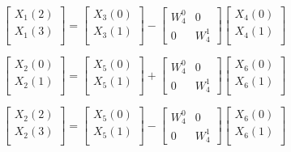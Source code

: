 \documentclass[journal,12pt,twocolumn]{IEEEtran}
\renewcommand\thesection{\arabic{section}}
\begin{document}
\begin{enumerate}[label=\arabic*.,ref=\thesection.\theenumi]
	\begin{equation}
		\begin{bmatrix}
			X_{1}(2) \\ 
			X_{1}(3)\\ 
		\end{bmatrix}
		=
		\begin{bmatrix}
			X_{3}(0) \\ 
			X_{3}(1)\\ 
		\end{bmatrix}
		-
		\begin{bmatrix}
			W^{0}_{4} & 0\\
			0 & W^{1}_{4}
		\end{bmatrix}
		\begin{bmatrix}
			X_{4}(0) \\ 
			X_{4}(1) \\ 
		\end{bmatrix}
	\end{equation}
	
	\begin{equation}
		\begin{bmatrix}
			X_{2}(0) \\ 
			X_{2}(1)\\ 
		\end{bmatrix}
		=
		\begin{bmatrix}
			X_{5}(0) \\ 
			X_{5}(1)\\ 
		\end{bmatrix}
		+
		\begin{bmatrix}
			W^{0}_{4} & 0\\
			0 & W^{1}_{4}
		\end{bmatrix}
		\begin{bmatrix}
			X_{6}(0) \\ 
			X_{6}(1) \\ 
		\end{bmatrix}
	\end{equation}
	
	\begin{equation}
		\begin{bmatrix}
			X_{2}(2) \\ 
			X_{2}(3)\\ 
		\end{bmatrix}
		=
		\begin{bmatrix}
			X_{5}(0) \\ 
			X_{5}(1)\\ 
		\end{bmatrix}
		-
		\begin{bmatrix}
			W^{0}_{4} & 0\\
			0 & W^{1}_{4}
		\end{bmatrix}
		\begin{bmatrix}
			X_{6}(0) \\ 
			X_{6}(1) \\ 
		\end{bmatrix}
	\end{equation}
	

\end{enumerate}
\end{document}
